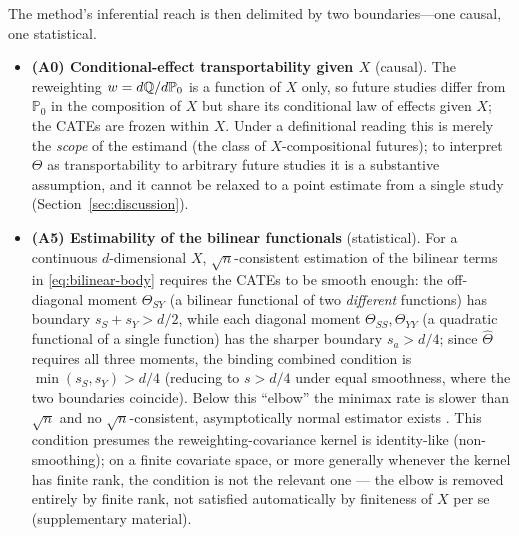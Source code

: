 \documentclass{article}
\newcommand{\PP}{\mathbb{P}}
\begin{document}
The method's inferential reach is then delimited by two boundaries---one causal,
one statistical.
\begin{itemize}
    \item \textbf{(A0) Conditional-effect transportability given $X$} (causal). The
    reweighting $w=d\Q/d\PP_0$ is a function of $X$ only, so future studies differ
    from $\PP_0$ in the composition of $X$ but share its conditional law of effects
    given $X$; the CATEs are frozen within $X$. Under a definitional reading this
    is merely the \emph{scope} of the estimand (the class of $X$-compositional
    futures); to interpret $\Theta$ as transportability to arbitrary future studies
    it is a substantive assumption, and it cannot be relaxed to a point estimate
    from a single study (Section~\ref{sec:discussion}).
    \item \textbf{(A5) Estimability of the bilinear functionals} (statistical). For
    a continuous $d$-dimensional $X$, $\sqrt{n}$-consistent estimation of the
    bilinear terms in \eqref{eq:bilinear-body} requires the CATEs to be smooth
    enough: the off-diagonal moment $\Theta_{SY}$ (a bilinear functional of two
    \emph{different} functions) has boundary $s_S+s_Y>d/2$, while each diagonal
    moment $\Theta_{SS},\Theta_{YY}$ (a quadratic functional of a single function)
    has the sharper boundary $s_a>d/4$; since $\hat\Theta$ requires all three
    moments, the binding combined condition is $\min(s_S,s_Y)>d/4$ (reducing to
    $s>d/4$ under equal smoothness, where the two boundaries coincide). Below this
    ``elbow'' the minimax rate is slower than $\sqrt{n}$ and no $\sqrt{n}$-consistent,
    asymptotically normal estimator exists
    \citep{BickelRitov1988,BirgeMassart1995,Robins2008HOIF,Robins2017Minimax,Kennedy2024Minimax}.
    This condition presumes the reweighting-covariance kernel is identity-like
    (non-smoothing); on a finite covariate space, or more generally whenever the
    kernel has finite rank, the condition is not the relevant one --- the elbow is
    removed entirely by finite rank, not satisfied automatically by finiteness of
    $X$ per se (supplementary material).
\end{itemize}
\end{document}
